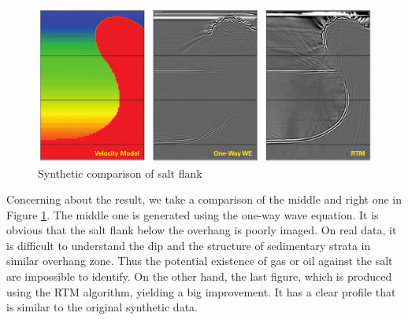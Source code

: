 \begin{figure}[h]
  \hfill
  \includegraphics[scale=.25]{img/velocity_model.png}
  \caption{Synthetic comparison of salt flank}
  \label{fig:comparison}
\end{figure}

Concerning about the result, we take a comparison of the middle and right
one in Figure \ref{fig:comparison}. The middle one is generated using the
one-way wave equation. It is obvious that the salt flank below the overhang
is poorly imaged. On real data, it is difficult to understand the dip and
the structure of sedimentary strata in similar overhang zone. Thus the
potential existence of gas or oil against the salt are impossible to
identify. On the other hand, the last figure, which is produced using the
RTM algorithm, yielding a big improvement. It has a clear profile that is
similar to the original synthetic data.

